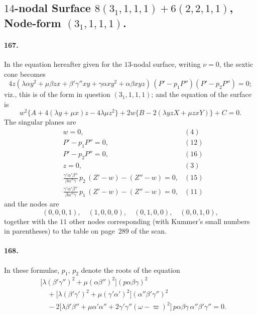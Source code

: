 \documentclass[11pt,a4paper]{article}
\begin{document}
\subsection*{$14$-nodal Surface $8(3_1, 1, 1, 1) + 6(2, 2, 1, 1)$,
Node-form $(3_1, 1, 1, 1)$.}

\paragraph{167.}
In the equation hereafter given for the $13$-nodal surface, writing
$\nu = 0$, the sextic cone becomes
\[
4z(\lambda \alpha y^2 + \mu \beta z x + \beta'\gamma'' xy + \gamma \alpha xy^2
+ \alpha\beta xyz)\,(P' - p_1 P'')(P' - p_2 P'') = 0;
\]
viz., this is of the form in question $(3_1, 1, 1, 1)$; and the equation
of the surface is
\[
w^2\bigl\{A + 4(\lambda y + \mu x) z - 4\lambda\mu z^2\bigr\}
+ 2 w\bigl\{B - 2(\lambda yzX + \mu zxY)\bigr\} + C = 0.
\]
The singular planes are
\[
\begin{aligned}
& w = 0, & (4) \\
& P' - p_1 P'' = 0, & (12) \\
& P' - p_2 P'' = 0, & (16) \\
& z = 0, & (3) \\
& \tfrac{\gamma'\alpha'\beta''}{\beta\alpha''\gamma}\, p_2\,(Z' - w) - (Z'' - w) = 0, & (15) \\
& \tfrac{\gamma'\alpha'\beta''}{\beta\alpha''\gamma}\, p_1\,(Z' - w) - (Z'' - w) = 0, & (11)
\end{aligned}
\]
and the nodes are
\[
(0,0,0,1),\quad (1,0,0,0),\quad (0,1,0,0),\quad (0,0,1,0),
\]
together with the $11$ other nodes corresponding (with Kummer's small
numbers in parentheses) to the table on page~$289$ of the scan.

\paragraph{168.}
In these formulae, $p_1$, $p_2$ denote the roots of the equation
\[
\begin{aligned}
&\bigl[\lambda(\beta'\gamma'')^2 + \mu(\alpha\beta'')^2\bigr](p\alpha\beta\gamma)^2 \\
&\quad + \bigl[\lambda(\beta'\gamma')^2 + \mu(\gamma'\alpha')^2\bigr](\alpha''\beta'\gamma'')^2 \\
&\quad - 2\bigl[\lambda\beta'\beta'' + \mu\alpha'\alpha''
+ 2\gamma'\gamma''(\omega - \varpi)^2\bigr]\, p\alpha\beta\gamma\,\alpha''\beta'\gamma'' = 0.
\end{aligned}
\]
\end{document}
